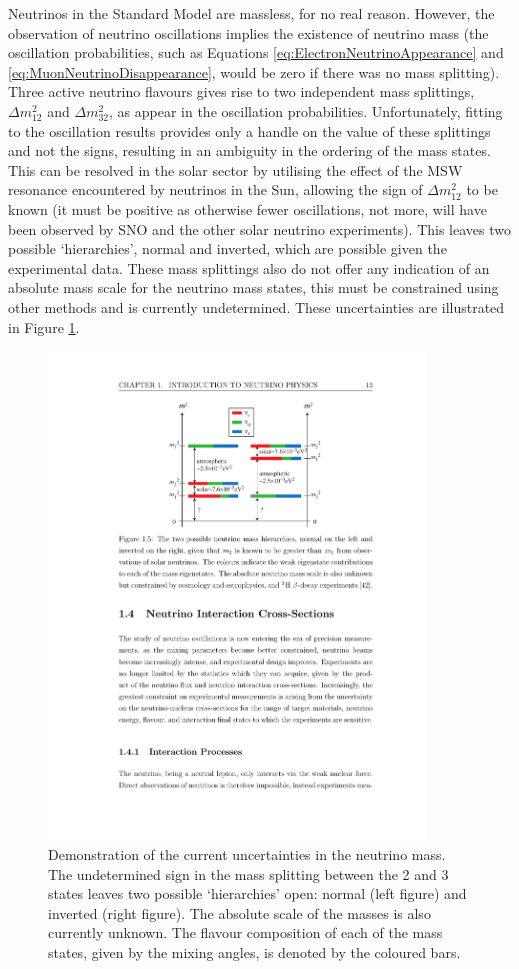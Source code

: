 Neutrinos in the Standard Model are massless, for no real reason.  However, the observation of neutrino oscillations implies the existence of neutrino mass (the oscillation probabilities, such as Equations \ref{eq:ElectronNeutrinoAppearance} and \ref{eq:MuonNeutrinoDisappearance}, would be zero if there was no mass splitting).  Three active neutrino flavours gives rise to two independent mass splittings, $\Delta m_{12}^2$ and $\Delta m_{32}^2$, as appear in the oscillation probabilities.  Unfortunately, fitting to the oscillation results provides only a handle on the value of these splittings and not the signs, resulting in an ambiguity in the ordering of the mass states.  This can be resolved in the solar sector by utilising the effect of the MSW resonance encountered by neutrinos in the Sun, allowing the sign of $\Delta m_{12}^2$ to be known (it must be positive as otherwise fewer oscillations, not more, will have been observed by SNO and the other solar neutrino experiments).  This leaves two possible `hierarchies', normal and inverted, which are possible given the experimental data.  These mass splittings also do not offer any indication of an absolute mass scale for the neutrino mass states, this must be constrained using other methods and is currently undetermined.  These uncertainties are illustrated in Figure \ref{fig:MassHierarchy}.

\begin{figure}
  \centering
  \includegraphics[width=10cm]{MassHierarchy.pdf}
  \caption[Demonstration of the current uncertainties in the neutrino mass.]{Demonstration of the current uncertainties in the neutrino mass.  The undetermined sign in the mass splitting between the 2 and 3 states leaves two possible `hierarchies' open: normal (left figure) and inverted (right figure).  The absolute scale of the masses is also currently unknown.  The flavour composition of each of the mass states, given by the mixing angles, is denoted by the coloured bars.}
  \label{fig:MassHierarchy}
\end{figure}

